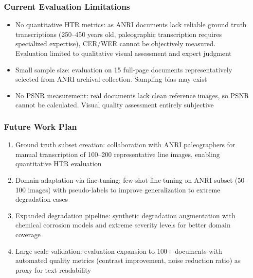 \documentclass[journal]{IEEEtran}
\begin{document}
\subsubsection{Current Evaluation Limitations}
\begin{itemize}
    \item No quantitative HTR metrics: as ANRI documents lack reliable ground truth transcriptions (250--450 years old, paleographic transcription requires specialized expertise), CER/WER cannot be objectively measured. Evaluation limited to qualitative visual assessment and expert judgment
    
    \item Small sample size: evaluation on 15 full-page documents representatively selected from ANRI archival collection. Sampling bias may exist
    
    \item No PSNR measurement: real documents lack clean reference images, so PSNR cannot be calculated. Visual quality assessment entirely subjective
\end{itemize}

\subsubsection{Future Work Plan}
\begin{enumerate}
    \item Ground truth subset creation: collaboration with ANRI paleographers for manual transcription of 100--200 representative line images, enabling quantitative HTR evaluation
    
    \item Domain adaptation via fine-tuning: few-shot fine-tuning on ANRI subset (50--100 images) with pseudo-labels to improve generalization to extreme degradation cases
    
    \item Expanded degradation pipeline: synthetic degradation augmentation with chemical corrosion models and extreme severity levels for better domain coverage
    
    \item Large-scale validation: evaluation expansion to 100+ documents with automated quality metrics (contrast improvement, noise reduction ratio) as proxy for text readability
\end{enumerate}
\end{document}
